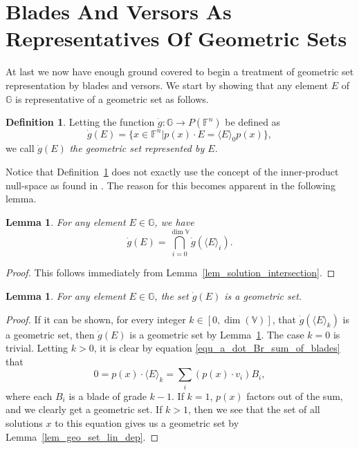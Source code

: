 \documentclass{birkjour}
\newtheorem{lem}[thm]{Lemma}
\theoremstyle{definition}
\newtheorem{defn}[thm]{Definition}
\theoremstyle{remark}
\numberwithin{equation}{section}
\newcommand{\F}{\mathbb{F}}
\newcommand{\G}{\mathbb{G}}
\newcommand{\V}{\mathbb{V}}
\newcommand{\gd}{\dot{g}}
\begin{document}
\section{Blades And Versors As Representatives Of Geometric Sets}

At last we now have enough ground covered to begin a treatment of geometric set representation by blades and versors.
We start by showing that any element $E$ of $\G$ is representative of a geometric set as follows.

\begin{defn}\label{def_geo_set_rep_by_E}
Letting the function $\gd:\G\to P(\F^n)$ be defined as
\begin{equation*}
\gd(E) = \{x\in\F^n|p(x)\cdot E=\langle E\rangle_0p(x)\},
\end{equation*}
we call $\gd(E)$ \emph{the geometric set represented by $E$}.
\end{defn}

Notice that Definition~\ref{def_geo_set_rep_by_E} does not exactly use the concept of
the inner-product null-space as found in \cite{}.  The reason for this becomes apparent
in the following lemma.

\begin{lem}\label{lem_intersect_grade_parts}
For any element $E\in\G$, we have
\begin{equation*}
\gd(E) = \bigcap_{i=0}^{\dim\V}\gd(\langle E\rangle_i).
\end{equation*}
\end{lem}
\begin{proof}
This follows immediately from Lemma~\ref{lem_solution_intersection}.
\end{proof}

\begin{lem}
For any element $E\in\G$, the set $\gd(E)$ is a geometric set.
\end{lem}
\begin{proof}
If it can be shown, for every integer $k\in[0,\dim(\V)]$, that $\gd(\langle E\rangle_k)$ is a geometric set,
then $\gd(E)$ is a geometric set by Lemma~\ref{lem_intersect_grade_parts}.
The case $k=0$ is trivial.  Letting $k>0$, it is clear by equation \eqref{equ_a_dot_Br_sum_of_blades} that
\begin{equation*}
0 = p(x)\cdot\langle E\rangle_k = \sum_i (p(x)\cdot v_i)B_i,
\end{equation*}
where each $B_i$ is a blade of grade $k-1$.  If $k=1$, $p(x)$ factors out of the sum, and we clearly get a geometric
set.  If $k>1$, then we see that the set of all solutions $x$
to this equation gives us a geometric set by Lemma~\ref{lem_geo_set_lin_dep}.
\end{proof}
\end{document}
